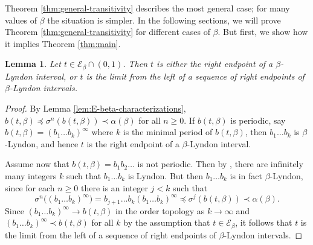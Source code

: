 \documentclass[11pt]{amsart}
\newtheorem{lemma}[theorem]{Lemma}
\theoremstyle{definition}
\theoremstyle{remark}
\numberwithin{equation}{section}
\newcommand{\EE}{\mathscr{E}}
\newcommand{\f}{\infty}
\newcommand{\al}{\alpha}
\newcommand{\lle}{\preccurlyeq}
\newcommand{\si}{\sigma}
\begin{document}
Theorem \ref{thm:general-transitivity} describes the most general case; for many values of $\beta$ the situation is simpler. In the following sections, we will prove Theorem \ref{thm:general-transitivity} for different cases of $\beta$. But first, we show how it implies Theorem \ref{thm:main}.

\begin{lemma} \label{lem:E-beta-next-to-beta-Lyndon}
Let $t\in\EE_\beta\cap(0,1)$. Then $t$ is either the right endpoint of a $\beta$-Lyndon interval, or $t$ is the limit from the left of a sequence of right endpoints of $\beta$-Lyndon intervals.
\end{lemma}

\begin{proof}
By Lemma \ref{lem:E-beta-characterizations}, $b(t,\beta)\lle\si^n(b(t,\beta))\prec\al(\beta)$ for all $n\geq 0$. If $b(t,\beta)$ is periodic, say $b(t,\beta)=(b_1\dots b_k)^\f$ where $k$ is the minimal period of $b(t,\beta)$, then $b_1\dots b_k$ is $\beta$-Lyndon, and hence $t$ is the right endpoint of a $\beta$-Lyndon interval.

Assume now that $b(t,\beta)=b_1b_2\dots$ is not periodic. Then by \cite[Lemma 3.5]{Kalle-Kong-Langeveld-Li-18}, there are infinitely many integers $k$ such that $b_1\dots b_k$ is Lyndon. But then $b_1\dots b_k$ is in fact $\beta$-Lyndon, since for each $n\geq 0$ there is an integer $j<k$ such that
\[
\si^n\big((b_1\dots b_k)^\f\big)=b_{j+1}\dots b_k(b_1\dots b_k)^\f\lle \si^j(b(t,\beta))\prec\al(\beta).
\]
Since $(b_1\dots b_k)^\f\to b(t,\beta)$ in the order topology as $k\to\f$ and $(b_1\dots b_k)^\f\prec b(t,\beta)$ for all $k$ by the assumption that $t\in\EE_\beta$, it follows that $t$ is the limit from the left of a sequence of right endpoints of $\beta$-Lyndon intervals.
\end{proof}
\end{document}
